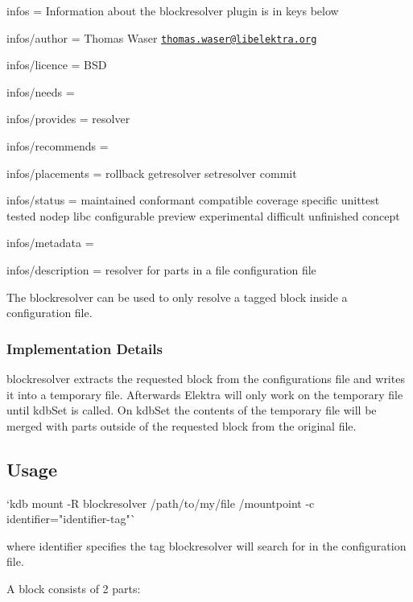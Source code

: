 
\begin{DoxyItemize}
\item infos = Information about the blockresolver plugin is in keys below
\item infos/author = Thomas Waser \href{mailto:thomas.waser@libelektra.org}{\tt thomas.\+waser@libelektra.\+org}
\item infos/licence = B\+SD
\item infos/needs =
\item infos/provides = resolver
\item infos/recommends =
\item infos/placements = rollback getresolver setresolver commit
\item infos/status = maintained conformant compatible coverage specific unittest tested nodep libc configurable preview experimental difficult unfinished concept
\item infos/metadata =
\item infos/description = resolver for parts in a file configuration file
\end{DoxyItemize}

The {\ttfamily blockresolver} can be used to only resolve a tagged block inside a configuration file.

\subsubsection*{Implementation Details}

{\ttfamily blockresolver} extracts the requested block from the configurations file and writes it into a temporary file. Afterwards Elektra will only work on the temporary file until kdb\+Set is called. On kdb\+Set the contents of the temporary file will be merged with parts outside of the requested block from the original file.

\subsection*{Usage}

\begin{DoxyVerb}`kdb mount -R blockresolver /path/to/my/file /mountpoint -c identifier="identifier-tag"`
\end{DoxyVerb}


where {\ttfamily identifier} specifies the tag {\ttfamily blockresolver} will search for in the configuration file.

A block consists of 2 parts\+:



